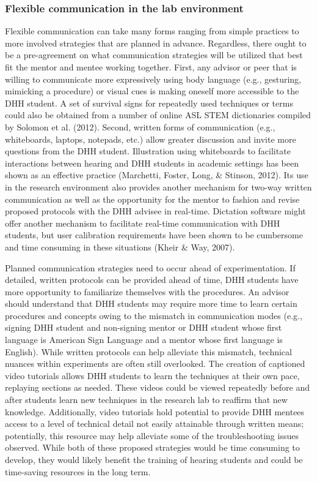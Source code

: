 \documentclass[11.5pt]{sig-alternate} %
\begin{document}
\begin{large}
\subsubsection*{Flexible communication in the lab environment} Flexible communication can take many forms ranging from simple practices to more involved strategies that are planned in advance. Regardless, there ought to be a pre-agreement on what communication strategies will be utilized that best fit the mentor and mentee working together. First, any advisor or peer that is willing to communicate more expressively using body language (e.g., gesturing, mimicking a procedure) or visual cues is making oneself more accessible to the DHH student. A set of survival signs for repeatedly used techniques or terms could also be obtained from a number of online ASL STEM dictionaries compiled by Solomon et al. (2012). Second, written forms of communication (e.g., whiteboards, laptops, notepads, etc.) allow greater discussion and invite more questions from the DHH student. Illustration using whiteboards to facilitate interactions between hearing and DHH students in academic settings has been shown as an effective practice (Marchetti, Foster, Long, \& Stinson, 2012). Its use in the research environment also provides another mechanism for two-way written communication as well as the opportunity for the mentor to fashion and revise proposed protocols with the DHH advisee in real-time. Dictation software might offer another mechanism to facilitate real-time communication with DHH students, but user calibration requirements have been shown to be cumbersome and time consuming in these situations (Kheir \& Way, 2007). 

Planned communication strategies need to occur ahead of experimentation. If detailed, written protocols can be provided ahead of time, DHH students have more opportunity to familiarize themselves with the procedures. An advisor should understand that DHH students may require more time to learn certain procedures and concepts owing to the mismatch in communication modes (e.g., signing DHH student and non-signing mentor or DHH student whose first language is American Sign Language and a mentor whose first language is English). While written protocols can help alleviate this mismatch, technical nuances within experiments are often still overlooked. The creation of captioned video tutorials allows DHH students to learn the techniques at their own pace, replaying sections as needed. These videos could be viewed repeatedly before and after students learn new techniques in the research lab to reaffirm that new knowledge. Additionally, video tutorials hold potential to provide DHH mentees access to a level of technical detail not easily attainable through written means; potentially, this resource may help alleviate some of the troubleshooting issues observed. While both of these proposed strategies would be time consuming to develop, they would likely benefit the training of hearing students and could be time-saving resources in the long term. 


\end{large}
\end{document}
